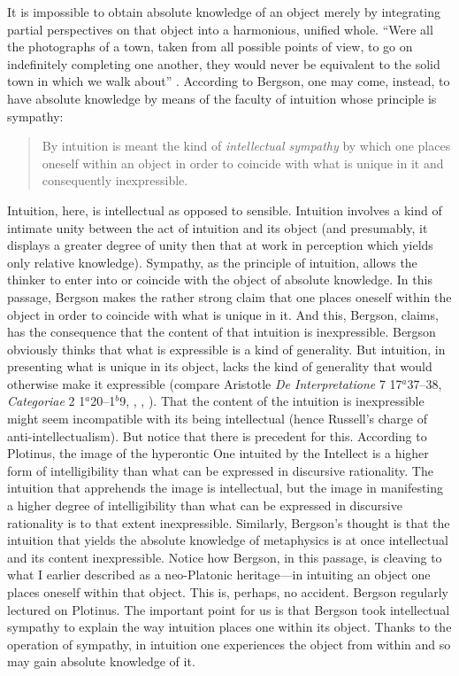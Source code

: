 It is impossible to obtain absolute knowledge of an object merely by integrating partial perspectives on that object into a harmonious, unified whole. ``Were all the photographs of a town, taken from all possible points of view, to go on indefinitely completing one another, they would never be equivalent to the solid town in which we walk about'' \citep[5]{Bergson:1912ud}. According to Bergson, one may come, instead, to have absolute knowledge by means of the faculty of intuition whose principle is sympathy:
\begin{quote}
	By intuition is meant the kind of \emph{intellectual sympathy} by which one places oneself within an object in order to coincide with what is unique in it and consequently inexpressible. \citep[7]{Bergson:1912ud}
\end{quote}
Intuition, here, is intellectual as opposed to sensible. Intuition involves a kind of intimate unity between the act of intuition and its object (and presumably, it displays a greater degree of unity then that at work in perception which yields only relative knowledge). Sympathy, as the principle of intuition, allows the thinker to enter into or coincide with the object of absolute knowledge. In this passage, Bergson makes the rather strong claim that one places oneself within the object in order to coincide with what is unique in it. And this, Bergson, claims, has the consequence that the content of that intuition is inexpressible. Bergson obviously thinks that what is expressible is a kind of generality. But intuition, in presenting what is unique in its object, lacks the kind of generality that would otherwise make it expressible (compare Aristotle \emph{De Interpretatione} 7 17\( ^{a} \)37--38, \emph{Categoriae} 2 1\( ^{a} \)20--1\( ^{b} \)9, \citealt[4]{Frege:1882uq}, \citealt[44]{Prichard:1909yg}, \citealt[52]{Lewis:1929fk}). That the content of the intuition is inexpressible might seem incompatible with its being intellectual (hence Russell's \citeyear{Russell:1912rt} charge of anti-intellectualism). But notice that there is precedent for this. According to Plotinus, the image of the hyperontic One intuited by the Intellect is a higher form of intelligibility than what can be expressed in discursive rationality. The intuition that apprehends the image is intellectual, but the image in manifesting a higher degree of intelligibility than what can be expressed in discursive rationality is to that extent inexpressible. Similarly, Bergson's thought is that the intuition that yields the absolute knowledge of metaphysics is at once intellectual and its content inexpressible. Notice how Bergson, in this passage, is cleaving to what I earlier described as a neo-Platonic heritage---in intuiting an object one places oneself within that object. This is, perhaps, no accident. Bergson regularly lectured on Plotinus. The important point for us is that Bergson took intellectual sympathy to explain the way intuition places one within its object. Thanks to the operation of sympathy, in intuition one experiences the object from within and so may gain absolute knowledge of it.

